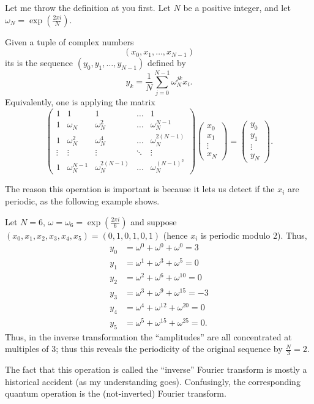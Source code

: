 \documentclass[11pt]{scrreprt}
\begin{document}
Let me throw the definition at you first.
Let $N$ be a positive integer, and let $\omega_N = \exp\left( \frac{2\pi i}{N} \right)$.
\begin{definition}
	Given a tuple of complex numbers
	\[ \left( x_0, x_1, \dots, x_{N-1} \right) \]
	its  is 
	the sequence $(y_0, y_1, \dots, y_{N-1})$ defined by
	\[ y_k = \frac1N \sum_{j=0}^{N-1} \omega_N^{jk} x_i. \]
	Equivalently, one is applying the matrix
	\[
		\begin{pmatrix} 
			1 & 1 & 1 & \dots & 1 \\
			1 & \omega_N & \omega_N^2 & \dots & \omega_N^{N-1} \\
			1 & \omega_N^2 & \omega_N^4 & \dots & \omega_N^{2(N-1)} \\
			\vdots & \vdots & \vdots & \ddots & \vdots \\
			1 & \omega_N^{N-1} & \omega_N^{2(N-1)} & \dots & \omega_N^{(N-1)^2}
		\end{pmatrix}
		\begin{pmatrix} x_0 \\ x_1 \\ \vdots \\ x_N \end{pmatrix}
		=
		\begin{pmatrix} y_0 \\ y_1 \\ \vdots \\ y_N \end{pmatrix}.
	\]
\end{definition}
The reason this operation is important is because it lets
us detect if the $x_i$ are periodic, as the following example shows.
\begin{example}
	Let $N = 6$, $\omega = \omega_6 = \exp(\frac{2\pi i}{6})$
	and suppose $(x_0,x_1,x_2,x_3,x_4,x_5)=(0,1,0,1,0,1)$
	(hence $x_i$ is periodic modulo $2$).
	Thus,
	\begin{align*}
		y_0 &= \omega^0 + \omega^0+ \omega^0 = 3 \\
		y_1 &= \omega^1 + \omega^3 + \omega^5 = 0 \\
		y_2 &= \omega^2 + \omega^{6} + \omega^{10} = 0 \\
		y_3 &= \omega^3 + \omega^9 + \omega^{15} = -3 \\
		y_4 &= \omega^4 + \omega^{12} + \omega^{20} = 0 \\
		y_5 &= \omega^5 + \omega^{15} + \omega^{25} = 0.
	\end{align*}
	Thus, in the inverse transformation the ``amplitudes''
	are all concentrated at multiples of $3$;
	thus this reveals the periodicity of the original
	sequence by $\frac N3 = 2$.
\end{example}
\begin{remark}
	The fact that this operation is called the ``inverse''
	Fourier transform is mostly a historical accident
	(as my understanding goes).
	Confusingly, the corresponding quantum operation is the
	(not-inverted) Fourier transform.
\end{remark}
\end{document}
